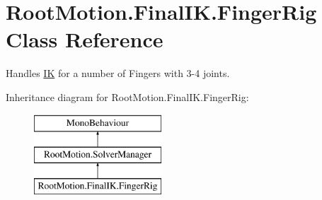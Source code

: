 \hypertarget{class_root_motion_1_1_final_i_k_1_1_finger_rig}{}\section{Root\+Motion.\+Final\+I\+K.\+Finger\+Rig Class Reference}
\label{class_root_motion_1_1_final_i_k_1_1_finger_rig}


Handles \mbox{\hyperlink{class_root_motion_1_1_final_i_k_1_1_i_k}{IK}} for a number of Fingers with 3-\/4 joints.  


Inheritance diagram for Root\+Motion.\+Final\+I\+K.\+Finger\+Rig\+:\begin{figure}[H]
\begin{center}
\leavevmode
\includegraphics[height=3.000000cm]{class_root_motion_1_1_final_i_k_1_1_finger_rig}
\end{center}
\end{figure}
